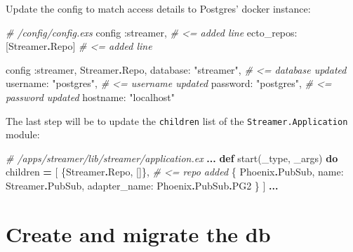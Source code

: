 \documentclass[
  oneside]{book}
\newenvironment{Shaded}{\begin{snugshade}}{\end{snugshade}}
\newcommand{\CommentTok}[1]{\textcolor[rgb]{0.56,0.35,0.01}{\textit{#1}}}
\newcommand{\ConstantTok}[1]{\textcolor[rgb]{0.00,0.00,0.00}{#1}}
\newcommand{\KeywordTok}[1]{\textcolor[rgb]{0.13,0.29,0.53}{\textbf{#1}}}
\newcommand{\NormalTok}[1]{#1}
\newcommand{\OperatorTok}[1]{\textcolor[rgb]{0.81,0.36,0.00}{\textbf{#1}}}
\newcommand{\StringTok}[1]{\textcolor[rgb]{0.31,0.60,0.02}{#1}}
\newcommand{\VariableTok}[1]{\textcolor[rgb]{0.00,0.00,0.00}{#1}}
\begin{document}
Update the config to match access details to Postgres' docker instance:

\begin{Shaded}
\begin{Highlighting}[]
\CommentTok{\# /config/config.exs}
\NormalTok{config }\VariableTok{:streamer}\NormalTok{,             }\CommentTok{\# \textless{}= added line }
  \VariableTok{ecto\_repos:}\NormalTok{ [}\ConstantTok{Streamer}\OperatorTok{.}\ConstantTok{Repo}\NormalTok{] }\CommentTok{\# \textless{}= added line}

\NormalTok{config }\VariableTok{:streamer}\NormalTok{, }\ConstantTok{Streamer}\OperatorTok{.}\ConstantTok{Repo}\NormalTok{,}
  \VariableTok{database:} \StringTok{"streamer"}\NormalTok{, }\CommentTok{\# \textless{}= database updated }
  \VariableTok{username:} \StringTok{"postgres"}\NormalTok{, }\CommentTok{\# \textless{}= username updated}
  \VariableTok{password:} \StringTok{"postgres"}\NormalTok{, }\CommentTok{\# \textless{}= password updated}
  \VariableTok{hostname:} \StringTok{"localhost"}
\end{Highlighting}
\end{Shaded}

The last step will be to update the \texttt{children} list of the \texttt{Streamer.Application} module:

\begin{Shaded}
\begin{Highlighting}[]
\CommentTok{\# /apps/streamer/lib/streamer/application.ex}
\OperatorTok{...}
  \KeywordTok{def}\NormalTok{ start(\_type, \_args) }\KeywordTok{do}
\NormalTok{    children }\OperatorTok{=}\NormalTok{ [}
\NormalTok{      \{}\ConstantTok{Streamer}\OperatorTok{.}\ConstantTok{Repo}\NormalTok{, []\}, }\CommentTok{\# \textless{}= repo added}
\NormalTok{      \{}
        \ConstantTok{Phoenix}\OperatorTok{.}\ConstantTok{PubSub}\NormalTok{,}
        \VariableTok{name:} \ConstantTok{Streamer}\OperatorTok{.}\ConstantTok{PubSub}\NormalTok{, }\VariableTok{adapter\_name:} \ConstantTok{Phoenix}\OperatorTok{.}\ConstantTok{PubSub}\OperatorTok{.}\ConstantTok{PG2}
\NormalTok{      \}}
\NormalTok{    ]}
    \OperatorTok{...}
\end{Highlighting}
\end{Shaded}

\hypertarget{create-and-migrate-the-db-1}{%
\section{Create and migrate the db}\label{create-and-migrate-the-db-1}}
\end{document}
